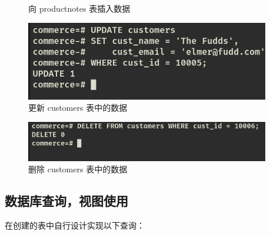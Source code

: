 \begin{enumerate}
\begin{figure}[H]
\begin{center}
  \end{center}
  \caption{向 productnotes 表插入数据}
\end{figure}
\begin{figure}[H]
  \begin{center}
    \includegraphics[width=0.95\textwidth,scale=0.5]{./figures/update_customers.png}
  \end{center}
  \caption{更新 customers 表中的数据}
\end{figure}
\begin{figure}[H]
  \begin{center}
    \includegraphics[width=0.95\textwidth,scale=0.5]{./figures/delete_customers.png}
  \end{center}
  \caption{删除 customers 表中的数据}
\end{figure}
\end{enumerate}

\subsection{数据库查询，视图使用}

在创建的表中自行设计实现以下查询：

